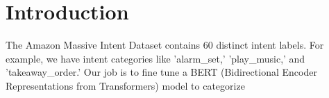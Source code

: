 \section*{Introduction}

The Amazon Massive Intent Dataset contains 60 distinct intent labels.
For example, we have intent categories like 'alarm\_set,' 'play\_music,' and 'takeaway\_order.'
Our job is to fine tune a BERT (Bidirectional Encoder Representations from Transformers) model to categorize 
